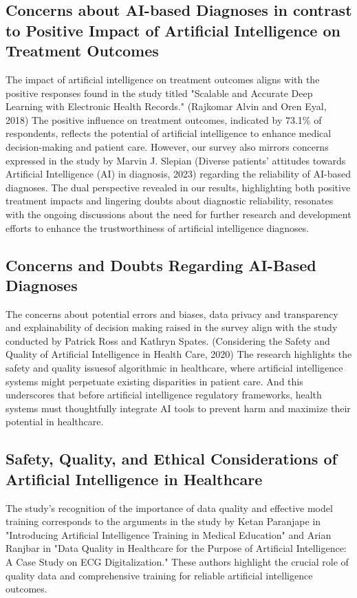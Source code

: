 \documentclass{ieeeaccess}
\begin{document}
\subsection{Concerns about AI-based Diagnoses in contrast to Positive Impact of Artificial Intelligence on Treatment Outcomes}
The impact of artificial intelligence on treatment outcomes aligns with the positive responses found in the study titled "Scalable and Accurate Deep Learning with Electronic Health Records." (Rajkomar Alvin and Oren Eyal, 2018) The positive influence on treatment outcomes, indicated by 73.1\% of respondents, reflects the potential of artificial intelligence to enhance medical decision-making and patient care. However, our survey also mirrors concerns expressed in the study by Marvin J. Slepian (Diverse patients’ attitudes towards Artificial Intelligence (AI) in diagnosis, 2023) regarding the reliability of AI-based diagnoses. The dual perspective revealed in our results, highlighting both positive treatment impacts and lingering doubts about diagnostic reliability, resonates with the ongoing discussions about the need for further research and development efforts to enhance the trustworthiness of artificial intelligence diagnoses.

\subsection{Concerns and Doubts Regarding AI-Based Diagnoses}
The concerns about potential errors and biases, data privacy and transparency and explainability of decision making raised in the survey align with the study conducted by Patrick Ross and Kathryn Spates. (Considering the Safety and Quality of Artificial Intelligence in Health Care, 2020) The research highlights the safety and quality issuesof algorithmic in healthcare, where artificial intelligence systems might perpetuate existing disparities in patient care. And this underscores that before artificial intelligence regulatory frameworks, health systems must thoughtfully integrate AI tools to prevent harm and maximize their potential in healthcare.

\subsection{Safety, Quality, and Ethical Considerations of Artificial Intelligence in Healthcare}
The study's recognition of the importance of data quality and effective model training corresponds to the arguments in the study by Ketan Paranjape in "Introducing Artificial Intelligence Training in Medical Education" and Arian Ranjbar in "Data Quality in Healthcare for the Purpose of Artificial Intelligence: A Case Study on ECG Digitalization." These authors highlight the crucial role of quality data and comprehensive training for reliable artificial intelligence outcomes.
\end{document}

